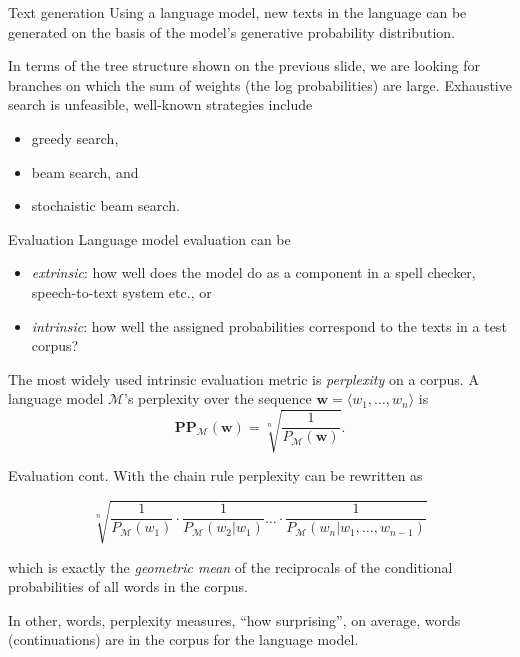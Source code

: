 \documentclass[style=upen, size=14pt]{powerdot}
\newcommand{\gold}{\color{arany}}
\theoremstyle{definition}
\begin{document}
\begin{slide}[toc=Text generation]{Text generation}
  Using a language model, new texts in the language can be generated on the
  basis of the model's generative probability distribution.

  In terms of the tree structure shown on the previous slide, we are looking for
  branches on which the sum of weights (the log probabilities) are large.
  Exhaustive search is unfeasible, well-known strategies include
  \begin{itemize}
  \item greedy search,
  \item beam search, and
  \item stochaistic beam search.
  \end{itemize}
\end{slide}

\begin{slide}[toc=Evaluation]{Evaluation}
  Language model evaluation can be
  \begin{itemize}
  \item \emph{\gold extrinsic}: how well does the model do as a component in a
    spell checker, speech-to-text system etc., or
  \item \emph{\gold intrinsic}: how well the assigned probabilities correspond
    to the texts in a test corpus?
  \end{itemize}
  The most widely used intrinsic evaluation metric is \emph{\gold perplexity} on
  a corpus. A language model $\mathcal M$'s perplexity over the sequence
  $\mathbf w = \langle w_1,\dots, w_n\rangle$ is
$$\mathbf{PP}_{\mathcal M}(\mathbf w) = \sqrt[n]{\frac{1}{P_{\mathcal M}(\mathbf w)}}.$$
\end{slide}

\begin{slide}[toc=]{Evaluation cont.}
  With the chain rule perplexity can be rewritten as

$${\sqrt[n]{\frac{1}{P_{\mathcal M}(w_1)}\cdot \frac{1}{P_{\mathcal M}(w_2 \vert w_1 )}\dots\cdot \frac{1}{P_{\mathcal M}(w_n\vert w_1,\dots, w_{n-1})}}}$$

which is exactly the \emph{geometric mean} of the reciprocals of the conditional
probabilities of all words in the corpus.\bigskip

In other, words, perplexity measures, ``how surprising'', on average, words
(continuations) are in the corpus for the language model.
\end{slide}
\end{document}
